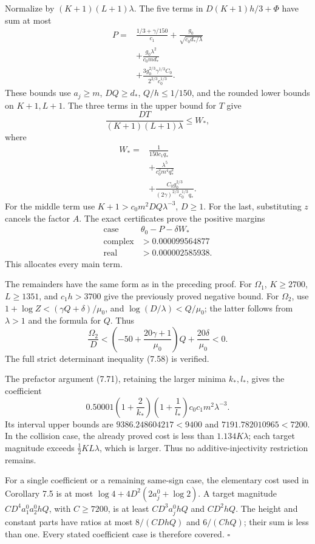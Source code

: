 \documentclass[
  11pt,
  a4paper,
]{article}
\begin{document}
Normalize by \((K+1)(L+1)\lambda\). The five terms in \(D(K+1)h/3+\Phi\)
have sum at most \[
\begin{aligned}
P={}&\frac{1/3+\gamma/150}{c_1}
+\frac{g_0}{\sqrt{c_0d_*/\lambda}}\\
&+\frac{g_0\lambda^2}{c_0md_*}\\
&+\frac{3g_0^{2/3}\gamma^{1/3}C_0}{2^{2/3}c_0^{1/3}}.
\end{aligned}
\] These bounds use \(a_j\ge m\), \(DQ\ge d_*\), \(Q/h\le1/150\), and
the rounded lower bounds on \(K+1,L+1\). The three terms in the upper
bound for \(T\) give \[
\frac{DT}{(K+1)(L+1)\lambda}
\le W_*,
\] where \[
\begin{aligned}
W_*={}&\frac1{150c_1q_*}\\
&+\frac{\lambda^5}{c_0^2m^4q_*^2}\\
&+\frac{C_0g_0^{2/3}}{(2\gamma)^{2/3}c_0^{1/3}q_*}.
\end{aligned}
\] For the middle term use \(K+1>c_0m^2DQ\lambda^{-3}\), \(D\ge1\). For
the last, substituting \(z\) cancels the factor \(A\). The exact
certificates prove the positive margins \[
\begin{array}{c|c}
\text{case}&\theta_0-P-\delta W_*\\\hline
\text{complex}&>0.000099564877\\
\text{real}&>0.000002585938.
\end{array} \tag{7.74}
\] This allocates every main term.

The remainders have the same form as in the preceding proof. For
\(\Omega_1\), \(K\ge2700\), \(L\ge1351\), and \(c_1h>3700\) give the
previously proved negative bound. For \(\Omega_2\), use
\(1+\log Z<(\gamma Q+\delta)/\mu_0\), and \(\log(D/\lambda)<Q/\mu_0\);
the latter follows from \(\lambda>1\) and the formula for \(Q\). Thus \[
\frac{\Omega_2}{D}
<\left(-50+\frac{20\gamma+1}{\mu_0}\right)Q
+\frac{20\delta}{\mu_0}<0.
\] The full strict determinant inequality (7.58) is verified.

The prefactor argument (7.71), retaining the larger minima \(k_*,l_*\),
gives the coefficient \[
0.50001\left(1+\frac2{k_*}\right)
\left(1+\frac1{l_*}\right)c_0c_1m^2\lambda^{-3}.
\] Its interval upper bounds are \(9386.248604217<9400\) and
\(7191.782010965<7200\). In the collision case, the already proved cost
is less than \(1.134K\lambda\); each target magnitude exceeds
\(\tfrac12KL\lambda\), which is larger. Thus no additive-injectivity
restriction remains.

For a single coefficient or a remaining same-sign case, the elementary
cost used in Corollary 7.5 is at most \(\log4+4D^2(2a_j^0+\log2)\). A
target magnitude \(CD^4a_1^0a_2^0hQ\), with \(C\ge7200\), is at least
\(CD^3a_j^0hQ\) and \(CD^2hQ\). The height and constant parts have
ratios at most \(8/(CDhQ)\) and \(6/(ChQ)\); their sum is less than one.
Every stated coefficient case is therefore covered. \(\square\)
\end{document}
